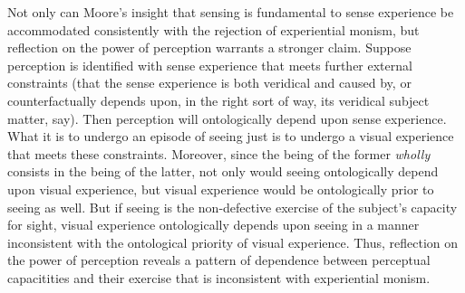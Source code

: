 \documentclass[12pt]{article}
\begin{document}
Not only can Moore's insight that sensing is fundamental to sense experience be accommodated consistently with the rejection of experiential monism, but reflection on the power of perception warrants a stronger claim. Suppose perception is identified with sense experience that meets further external constraints (that the sense experience is both veridical and caused by, or counterfactually depends upon, in the right sort of way, its veridical subject matter, say). Then perception will ontologically depend upon sense experience. What it is to undergo an episode of seeing just is to undergo a visual experience that meets these constraints. Moreover, since the being of the former \emph{wholly} consists in the being of the latter, not only would seeing ontologically depend upon visual experience, but visual experience would be ontologically prior to seeing as well. But if seeing is the non-defective exercise of the subject's capacity for sight, visual experience ontologically depends upon seeing in a manner inconsistent with the ontological priority of visual experience. Thus, reflection on the power of perception reveals a pattern of dependence between perceptual capacitities and their exercise that is inconsistent with experiential monism. 


\end{document}
